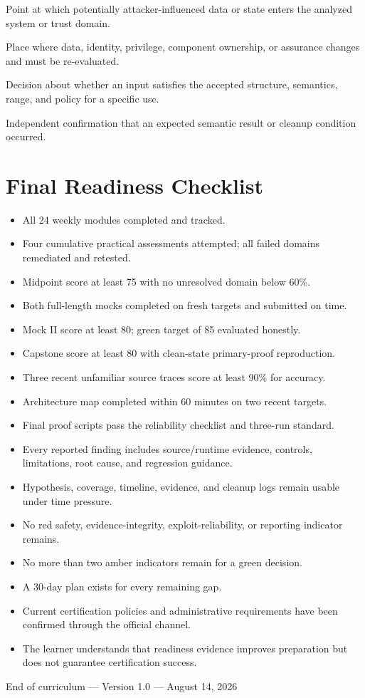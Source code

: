 \documentclass[11pt]{article}
\begin{document}
\begin{description}[style=nextline,leftmargin=1.5em,labelindent=0pt]
  \item[Source] Point at which potentially attacker-influenced data or state enters the analyzed system or trust domain.
  \item[Trust boundary] Place where data, identity, privilege, component ownership, or assurance changes and must be re-evaluated.
  \item[Validation] Decision about whether an input satisfies the accepted structure, semantics, range, and policy for a specific use.
  \item[Verification] Independent confirmation that an expected semantic result or cleanup condition occurred.
\end{description}

\section{Final Readiness Checklist}

\begin{itemize}[label=$\square$]
  \item All 24 weekly modules completed and tracked.
  \item Four cumulative practical assessments attempted; all failed domains remediated and retested.
  \item Midpoint score at least 75 with no unresolved domain below 60\%.
  \item Both full-length mocks completed on fresh targets and submitted on time.
  \item Mock II score at least 80; green target of 85 evaluated honestly.
  \item Capstone score at least 80 with clean-state primary-proof reproduction.
  \item Three recent unfamiliar source traces score at least 90\% for accuracy.
  \item Architecture map completed within 60 minutes on two recent targets.
  \item Final proof scripts pass the reliability checklist and three-run standard.
  \item Every reported finding includes source/runtime evidence, controls, limitations, root cause, and regression guidance.
  \item Hypothesis, coverage, timeline, evidence, and cleanup logs remain usable under time pressure.
  \item No red safety, evidence-integrity, exploit-reliability, or reporting indicator remains.
  \item No more than two amber indicators remain for a green decision.
  \item A 30-day plan exists for every remaining gap.
  \item Current certification policies and administrative requirements have been confirmed through the official channel.
  \item The learner understands that readiness evidence improves preparation but does not guarantee certification success.
\end{itemize}

\vfill
\begin{center}
  \color{TextGray}\sffamily\small
  End of curriculum --- Version 1.0 --- August 14, 2026
\end{center}
\end{document}
